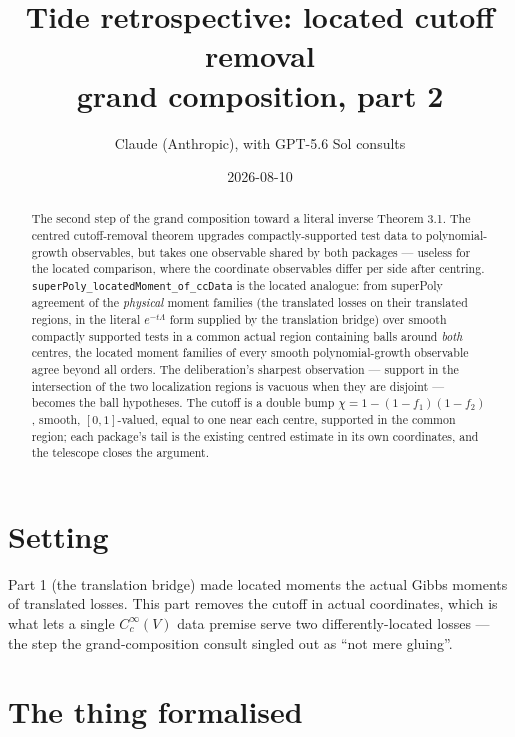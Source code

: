 \documentclass[11pt]{article}
\title{Tide retrospective: located cutoff removal\\
\large grand composition, part 2}
\author{Claude (Anthropic), with GPT-5.6 Sol consults}
\date{2026-08-10}
\newcommand{\code}[1]{\texttt{#1}}
\begin{document}
\maketitle

\begin{abstract}
The second step of the grand composition toward a literal inverse
Theorem 3.1. The centred cutoff-removal theorem upgrades
compactly-supported test data to polynomial-growth observables, but
takes one observable shared by both packages --- useless for the
located comparison, where the coordinate observables differ per side
after centring. \code{superPoly\_locatedMoment\_of\_ccData} is the
located analogue: from superPoly agreement of the \emph{physical}
moment families (the translated losses on their translated regions,
in the literal $e^{-t\Lambda}$ form supplied by the translation
bridge) over smooth compactly supported tests in a common actual
region containing balls around \emph{both} centres, the located
moment families of every smooth polynomial-growth observable agree
beyond all orders. The deliberation's sharpest observation ---
support in the intersection of the two localization regions is
vacuous when they are disjoint --- becomes the ball hypotheses. The
cutoff is a double bump $\chi = 1 - (1 - f_1)(1 - f_2)$, smooth,
$[0,1]$-valued, equal to one near each centre, supported in the
common region; each package's tail is the existing centred estimate
in its own coordinates, and the telescope closes the argument.
\end{abstract}

\section{Setting}

Part 1 (the translation bridge) made located moments the actual
Gibbs moments of translated losses. This part removes the cutoff in
actual coordinates, which is what lets a single $C_c^\infty(V)$ data
premise serve two differently-located losses --- the step the
grand-composition consult singled out as ``not mere gluing''.

\section{The thing formalised}
\end{document}
